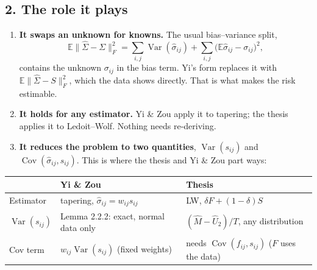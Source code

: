 \documentclass[12pt]{article}
\begin{document}
\subsection*{2. The role it plays}
\begin{enumerate}
\item \textbf{It swaps an unknown for knowns.} The usual bias--variance split,
\[
\mathbb{E}\|\hat\Sigma-\Sigma\|_F^2=\sum_{i,j}\operatorname{Var}(\hat\sigma_{ij})+\sum_{i,j}\big(\mathbb{E}\hat\sigma_{ij}-\sigma_{ij}\big)^2,
\]
contains the unknown $\sigma_{ij}$ in the bias term. Yi's form replaces it with $\mathbb{E}\|\hat\Sigma-S\|_F^2$, which
the data shows directly. That is what makes the risk estimable.
\item \textbf{It holds for any estimator.} Yi \& Zou apply it to tapering; the thesis applies it to
Ledoit--Wolf. Nothing needs re-deriving.
\item \textbf{It reduces the problem to two quantities}, $\operatorname{Var}(s_{ij})$ and
$\operatorname{Cov}(\hat\sigma_{ij},s_{ij})$. This is where the thesis and Yi \& Zou part ways:
\end{enumerate}
\begin{center}
\small
\begin{tabular}{@{}lll@{}}
\toprule
 & Yi \& Zou & Thesis \\
\midrule
Estimator & tapering, $\hat\sigma_{ij}=w_{ij}s_{ij}$ & LW, $\delta F+(1-\delta)S$ \\
$\operatorname{Var}(s_{ij})$ & Lemma 2.2.2: exact, normal data only & $(\hat M-\hat U_2)/T$, any distribution \\
Cov term & $w_{ij}\operatorname{Var}(s_{ij})$ (fixed weights) & needs $\operatorname{Cov}(f_{ij},s_{ij})$ ($F$ uses the data) \\
\bottomrule
\end{tabular}
\end{center}
\end{document}
